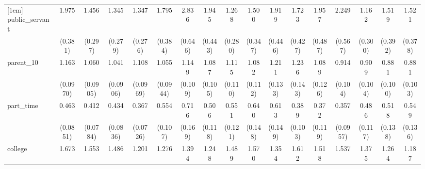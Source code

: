 {\begin{tabular}{l*{16}{c}}
[1em]
public\_servant      &       1.975\sym{***}&       1.456         &       1.345         &       1.347         &       1.795\sym{**} &       2.836\sym{***}&       1.945\sym{**} &       1.268         &       1.500         &       1.919\sym{**} &       1.723\sym{*}  &       1.957\sym{**} &       2.249\sym{**} &       1.162         &       1.519         &       1.521         \\
                    &     (0.381)         &     (0.297)         &     (0.279)         &     (0.276)         &     (0.384)         &     (0.646)         &     (0.443)         &     (0.280)         &     (0.347)         &     (0.446)         &     (0.427)         &     (0.487)         &     (0.567)         &     (0.300)         &     (0.392)         &     (0.378)         \\
[1em]
parent\_10           &       1.163         &       1.060         &       1.041         &       1.108         &       1.055         &       1.149         &       1.087         &       1.115         &       1.082         &       1.211         &       1.236         &       1.089         &       0.914         &       0.909         &       0.881         &       0.881         \\
                    &    (0.0970)         &    (0.0905)         &    (0.0906)         &    (0.0969)         &    (0.0944)         &     (0.109)         &     (0.105)         &     (0.110)         &     (0.112)         &     (0.133)         &     (0.143)         &     (0.126)         &     (0.104)         &     (0.104)         &     (0.100)         &     (0.103)         \\
[1em]
part\_time           &       0.463\sym{***}&       0.412\sym{***}&       0.434\sym{***}&       0.367\sym{***}&       0.554\sym{**} &       0.716         &       0.506\sym{**} &       0.551\sym{**} &       0.640         &       0.613\sym{*}  &       0.389\sym{***}&       0.372\sym{**} &       0.357\sym{***}&       0.486\sym{**} &       0.518\sym{*}  &       0.549\sym{*}  \\
                    &    (0.0851)         &    (0.0784)         &    (0.0836)         &    (0.0726)         &     (0.107)         &     (0.169)         &     (0.118)         &     (0.121)         &     (0.148)         &     (0.149)         &     (0.103)         &     (0.119)         &    (0.0957)         &     (0.117)         &     (0.138)         &     (0.136)         \\
[1em]
college             &       1.673\sym{***}&       1.553\sym{***}&       1.486\sym{***}&       1.201         &       1.276\sym{*}  &       1.394\sym{**} &       1.248         &       1.489\sym{**} &       1.570\sym{***}&       1.354\sym{*}  &       1.612\sym{**} &       1.518\sym{**} &       1.537\sym{**} &       1.375\sym{*}  &       1.264         &       1.187         \\

\end{tabular}}
